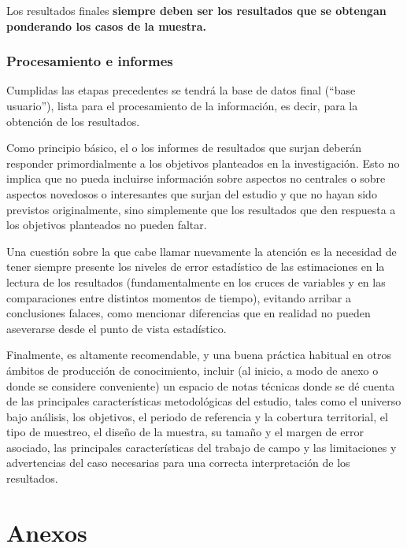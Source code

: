 \documentclass[
]{book}
\begin{document}
Los resultados finales \textbf{siempre deben ser los resultados que se obtengan ponderando los casos de la muestra.}

\hypertarget{procesamiento-e-informes}{%
\subsection{Procesamiento e informes}\label{procesamiento-e-informes}}

Cumplidas las etapas precedentes se tendrá la base de datos final (``base usuario''), lista para el procesamiento de la información, es decir, para la obtención de los resultados.

Como principio básico, el o los informes de resultados que surjan deberán responder primordialmente a los objetivos planteados en la investigación. Esto no implica que no pueda incluirse información sobre aspectos no centrales o sobre aspectos novedosos o interesantes que surjan del estudio y que no hayan sido previstos originalmente, sino simplemente que los resultados que den respuesta a los objetivos planteados no pueden faltar.

Una cuestión sobre la que cabe llamar nuevamente la atención es la necesidad de tener siempre presente los niveles de error estadístico de las estimaciones en la lectura de los resultados (fundamentalmente en los cruces de variables y en las comparaciones entre distintos momentos de tiempo), evitando arribar a conclusiones falaces, como mencionar diferencias que en realidad no pueden aseverarse desde el punto de vista estadístico.

Finalmente, es altamente recomendable, y una buena práctica habitual en otros ámbitos de producción de conocimiento, incluir (al inicio, a modo de anexo o donde se considere conveniente) un espacio de notas técnicas donde se dé cuenta de las principales características metodológicas del estudio, tales como el universo bajo análisis, los objetivos, el periodo de referencia y la cobertura territorial, el tipo de muestreo, el diseño de la muestra, su tamaño y el margen de error asociado, las principales características del trabajo de campo y las limitaciones y advertencias del caso necesarias para una correcta interpretación de los resultados.\\

\hypertarget{anexos}{%
\chapter*{\texorpdfstring{\textbf{Anexos}}{Anexos}}\label{anexos}}
\end{document}
